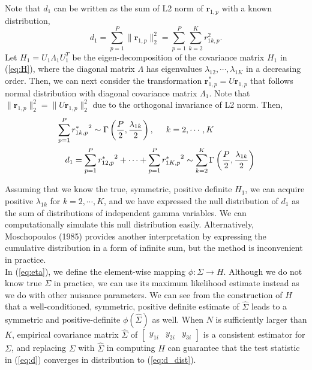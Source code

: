 \documentclass[aap,authoryear, preprint]{imsart}
\numberwithin{equation}{section}
\theoremstyle{plain}
\begin{document}
Note that $d_1$ can be written as the sum of L2 norm of $\bm{r}_{1,p}$ with a known distribution, 
\begin{equation}
d_1 = \sum_{p=1}^{P} \|\bm{r}_{1,p}\|_2^2 = \sum_{p=1}^{P} \sum_{k=2}^K r_{1k,p}^2.
\label{eq:d2}
\end{equation}
Let $H_1 = U_1 \Lambda_1 U_1^T$ be the eigen-decomposition of the covariance matrix $H_1$ in (\ref{eq:H}), where the diagonal matrix $\Lambda$ has eigenvalues $\lambda_{12}, \cdots, \lambda_{1K}$ in a decreasing order. Then, we can next consider the transformation $\bm{r}_{1,p}^* = U\bm{r}_{1,p}$ that follows normal distribution with diagonal covariance matrix $\Lambda_1$. Note that $\|\bm{r}_{1,p}\|_2^2 = \|U\bm{r}_{1,p}\|_2^2$ due to the orthogonal invariance of L2 norm. Then,
\begin{equation}
    \begin{multlined}
    \sum_{p=1}^{P} {r_{1k,p}^*}^2 \sim \Gamma \left( \frac{P}{2}, \frac{\lambda_{1k}}{2} \right), \hspace{5mm} k = 2, \cdots, K\\
    d_1 =  \sum_{p=1}^{P} {r_{12,p}^*}^2 + \cdots +\sum_{p=1}^P{r_{1K,p}^*}^2 \sim \sum_{k=2}^{K} \Gamma \left( \frac{P}{2}, \frac{\lambda_{1k}}{2}\right)
    \end{multlined}
    \label{eq:d_dist}
\end{equation}

Assuming that we know the true, symmetric, positive definite $H_1$, we can acquire positive $\lambda_{1k}$ for $k = 2, \cdots, K$, and we have expressed the null distribution of $d_1$ as the sum of distributions of independent gamma variables. We can computationally simulate this null distribution easily. Alternatively, Moschopoulos (1985) provides another interpretation by expressing the cumulative distribution in a form of infinite sum, but the method is inconvenient in practice.\\

In (\ref{eq:eta}), we define the element-wise mapping $\phi: \Sigma \rightarrow H$. Although we do not know true $\Sigma$ in practice, we can use its maximum likelihood estimate instead as we do with other nuisance parameters. We can see from the construction of $H$ that a well-conditioned, symmetric, positive definite estimate of $\hat{\Sigma}$ leads to a symmetric and positive-definite $\phi(\hat{\Sigma})$ as well. When $N$ is sufficiently larger than $K$, empirical covariance matrix $\hat{\Sigma}$ of $\begin{bmatrix} y_{1i} & y_{2i} & y_{3i} \end{bmatrix}$ is a consistent estimator for $\Sigma$, and replacing $\Sigma$ with $\hat{\Sigma}$ in computing $H$ can guarantee that the test statistic in (\ref{eq:d}) converges in distribution to (\ref{eq:d_dist}). \\
\end{document}
